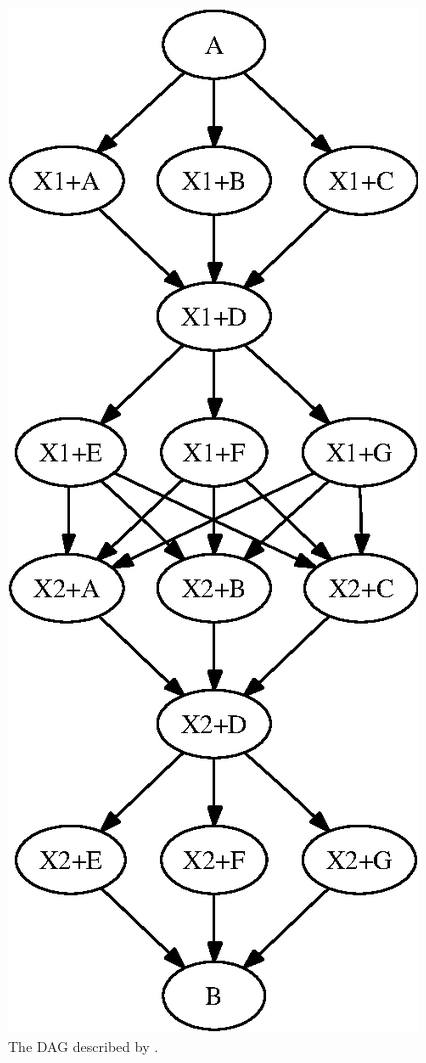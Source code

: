 \begin{figure}
\centering
\includegraphics{user-man/splice-s1.eps}
\caption{\label{fig:dagman-splice-s1} The DAG described by .}
\end{figure}

